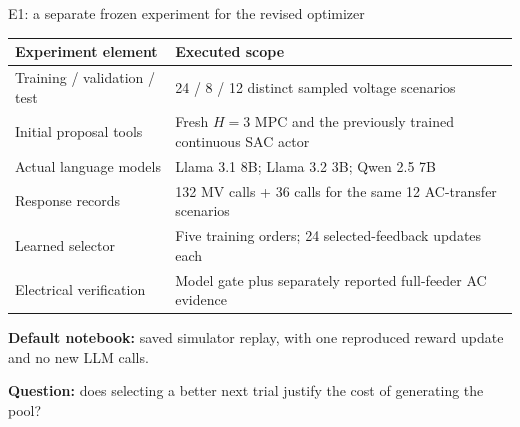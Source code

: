 \begin{frame}[t]{E1: a separate frozen experiment for the revised optimizer}
\deepdive

\fontsize{8.5}{10}\selectfont
\begin{tabular}{@{}p{.32\linewidth}p{.61\linewidth}@{}}
\toprule Experiment element & Executed scope \\
\midrule
Training / validation / test & 24 / 8 / 12 distinct sampled voltage scenarios \\
Initial proposal tools & Fresh $H=3$ MPC and the previously trained continuous SAC actor \\
Actual language models & Llama 3.1 8B; Llama 3.2 3B; Qwen 2.5 7B \\
Response records & 132 MV calls + 36 calls for the same 12 AC-transfer scenarios \\
Learned selector & Five training orders; 24 selected-feedback updates each \\
Electrical verification & Model gate plus separately reported full-feeder AC evidence \\
\bottomrule
\end{tabular}\par\medskip
\textbf{Default notebook:} saved simulator replay, with one reproduced reward update and no new LLM calls.
\par\medskip\textbf{Question:} does selecting a better next trial justify the cost of generating the pool?

\end{frame}

